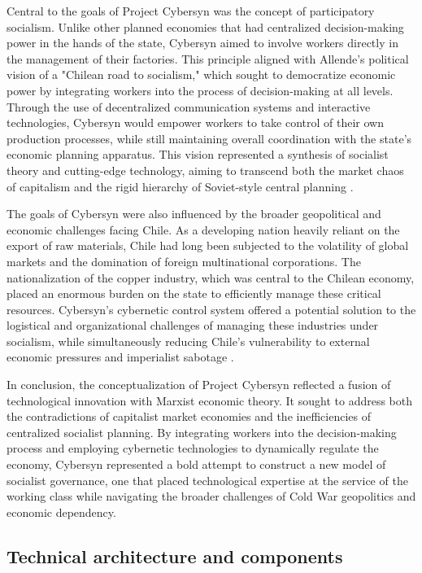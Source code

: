 \begin{refsection}
Central to the goals of Project Cybersyn was the concept of participatory socialism. Unlike other planned economies that had centralized decision-making power in the hands of the state, Cybersyn aimed to involve workers directly in the management of their factories. This principle aligned with Allende's political vision of a "Chilean road to socialism," which sought to democratize economic power by integrating workers into the process of decision-making at all levels. Through the use of decentralized communication systems and interactive technologies, Cybersyn would empower workers to take control of their own production processes, while still maintaining overall coordination with the state's economic planning apparatus. This vision represented a synthesis of socialist theory and cutting-edge technology, aiming to transcend both the market chaos of capitalism and the rigid hierarchy of Soviet-style central planning \cite[pp.~183-186]{medina2014}.

The goals of Cybersyn were also influenced by the broader geopolitical and economic challenges facing Chile. As a developing nation heavily reliant on the export of raw materials, Chile had long been subjected to the volatility of global markets and the domination of foreign multinational corporations. The nationalization of the copper industry, which was central to the Chilean economy, placed an enormous burden on the state to efficiently manage these critical resources. Cybersyn’s cybernetic control system offered a potential solution to the logistical and organizational challenges of managing these industries under socialism, while simultaneously reducing Chile’s vulnerability to external economic pressures and imperialist sabotage \cite[pp.~49-52]{harmer2011}.

In conclusion, the conceptualization of Project Cybersyn reflected a fusion of technological innovation with Marxist economic theory. It sought to address both the contradictions of capitalist market economies and the inefficiencies of centralized socialist planning. By integrating workers into the decision-making process and employing cybernetic technologies to dynamically regulate the economy, Cybersyn represented a bold attempt to construct a new model of socialist governance, one that placed technological expertise at the service of the working class while navigating the broader challenges of Cold War geopolitics and economic dependency.

\subsection{Technical architecture and components}


\end{refsection}
